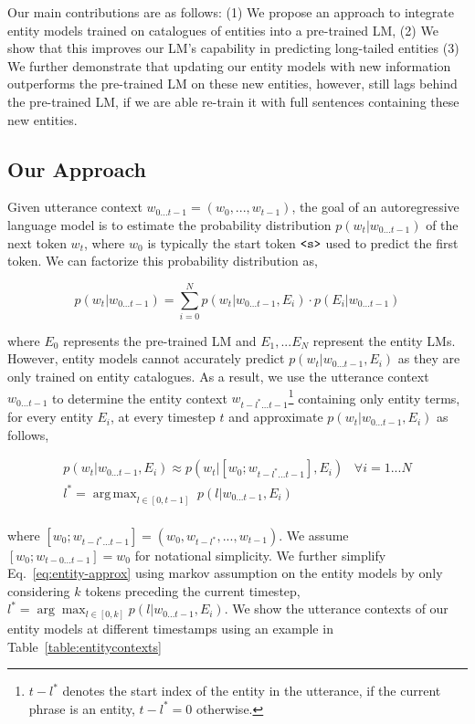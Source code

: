 \documentclass{article}
\DeclareMathOperator*{\argmax}{arg\,max}
\begin{document}
Our main contributions are as follows: (1) We propose an approach to integrate entity models trained on catalogues of entities into a pre-trained LM, (2) We show that this improves our LM's capability in predicting long-tailed entities (3) We further demonstrate that updating our entity models with new information outperforms the pre-trained LM on these new entities, however, still lags behind the pre-trained LM, if we are able re-train it with full sentences containing these new entities.


\subsection{Our Approach}
\label{approach}

Given utterance context $w_{0...t-1} = (w_0, ..., w_{t-1})$, the goal of an autoregressive language model is to estimate the probability distribution $p(w_t|w_{0...t-1})$ of the next token $w_t$, where $w_0$ is typically the start token $\verb|<s>|$ used to predict the first token. We can factorize this probability distribution as,

\begin{equation}
	\label{eq:lm-factorization}
	p(w_t|w_{0...t-1}) = \sum_{i=0}^{N} p(w_t|w_{0...t-1}, E_i) \cdot p(E_i | w_{0...t-1})
\end{equation}

where $E_0$ represents the pre-trained LM and $E_1, ... E_N$ represent the entity LMs. However, entity models cannot accurately predict $p(w_t|w_{0...t-1}, E_i)$ as they are only trained on entity catalogues. As a result, we use the utterance context $w_{0...t-1}$ to determine the entity context $w_{t-l^*...t-1}$\footnote{$t-l^*$ denotes the start index of the entity in the utterance, if the current phrase is an entity, $t-l^*=0$ otherwise.} containing only entity terms, for every entity $E_i$, at every timestep $t$ and approximate $p(w_t|w_{0...t-1}, E_i)$ as follows,

\begin{equation}
	\label{eq:entity-approx}
	\begin{gathered}
		p(w_t|w_{0...t-1}, E_i) \approx p(w_t | [w_0; w_{t-l^*...t-1}], E_i) \;\;\; \forall i = 1...N \\
		l^* = \argmax_{l \in [0, t-1]} \; p(l|w_{0...t-1}, E_i) \\
	\end{gathered}
\end{equation}


where $[w_0; w_{t-l^*...t-1}] = (w_0, w_{t-l^*}, ..., w_{t-1})$. We assume $[w_0; w_{t-0...t-1}] = w_0$ for notational simplicity. We further simplify Eq.~\ref{eq:entity-approx} using markov assumption on the entity models by only considering $k$ tokens preceding the current timestep, $l^* = \arg \max_{l \in [0, k]} p(l|w_{0...t-1}, E_i) $. We show the utterance contexts of our entity models at different timestamps using an example in Table~\ref{table:entitycontexts}
\end{document}
